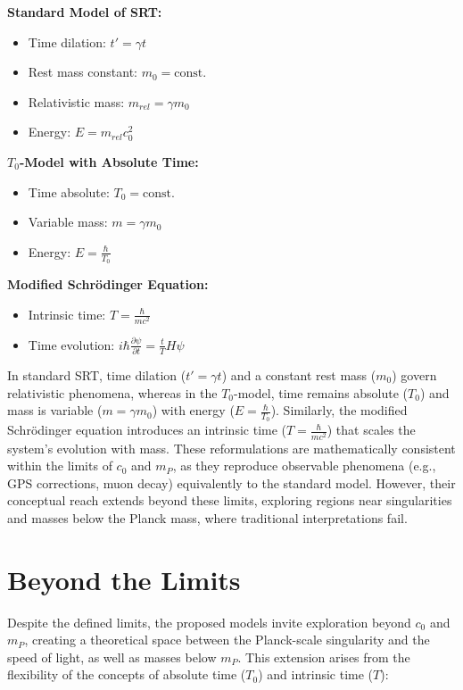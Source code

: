 \documentclass[a4paper,12pt]{article}
\begin{document}
	\begin{tcolorbox}[colback=blue!5!white,colframe=blue!75!black,title=Model Definitions]
		\textbf{Standard Model of SRT:}
		\begin{itemize}
			\item Time dilation: $t' = \gamma t$
			\item Rest mass constant: $m_0 = \text{const.}$
			\item Relativistic mass: $m_{rel} = \gamma m_0$
			\item Energy: $E = m_{rel}c_0^2$
		\end{itemize}
		
		\textbf{$T_0$-Model with Absolute Time:}
		\begin{itemize}
			\item Time absolute: $T_0 = \text{const.}$
			\item Variable mass: $m = \gamma m_0$
			\item Energy: $E = \frac{\hbar}{T_0}$
		\end{itemize}
		
		\textbf{Modified Schrödinger Equation:}
		\begin{itemize}
			\item Intrinsic time: $T = \frac{\hbar}{mc^2}$
			\item Time evolution: $i\hbar\frac{\partial\psi}{\partial t} = \frac{t}{T}H\psi$
		\end{itemize}
	\end{tcolorbox}
	
	In standard SRT, time dilation (\( t' = \gamma t \)) and a constant rest mass (\( m_0 \)) govern relativistic phenomena, whereas in the \( T_0 \)-model, time remains absolute (\( T_0 \)) and mass is variable (\( m = \gamma m_0 \)) with energy (\( E = \frac{\hbar}{T_0} \)). Similarly, the modified Schrödinger equation introduces an intrinsic time (\( T = \frac{\hbar}{m c^2} \)) that scales the system's evolution with mass. These reformulations are mathematically consistent within the limits of \( c_0 \) and \( m_P \), as they reproduce observable phenomena (e.g., GPS corrections, muon decay) equivalently to the standard model. However, their conceptual reach extends beyond these limits, exploring regions near singularities and masses below the Planck mass, where traditional interpretations fail.
	
	\section{Beyond the Limits}
	Despite the defined limits, the proposed models invite exploration beyond \( c_0 \) and \( m_P \), creating a theoretical space between the Planck-scale singularity and the speed of light, as well as masses below \( m_P \). This extension arises from the flexibility of the concepts of absolute time (\( T_0 \)) and intrinsic time (\( T \)):
	
\end{document}

